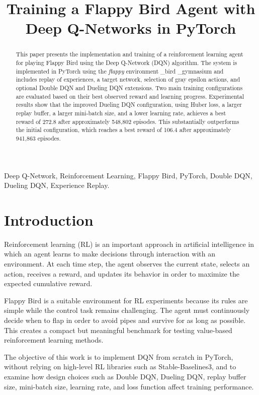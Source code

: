 \documentclass[conference]{IEEEtran}
\title{Training a Flappy Bird Agent with Deep Q-Networks in PyTorch}
\author{%
    \IEEEauthorblockN{Tran Van Thuan}
    \IEEEauthorblockA{\textit{Fill in your institution}\\\textit{Fill in your email}}
    \and
    \IEEEauthorblockN{Nguyen Vo Hoang Khang}
    \IEEEauthorblockA{ \textit{FPT University}\\ \textit{khangnvhse184634@fpt.edu.vn}}
}
\begin{document}
\maketitle

\begin{abstract}
This paper presents the implementation and training of a reinforcement learning agent for playing Flappy Bird using the Deep Q-Network (DQN) algorithm. The system is implemented in PyTorch using the \textit{flappy} environment \_bird \_gymnasium and includes replay of experiences, a target network, selection of gray epsilon actions, and optional Double DQN and Dueling DQN extensions. Two main training configurations are evaluated based on their best observed reward and learning progress. Experimental results show that the improved Dueling DQN configuration, using Huber loss, a larger replay buffer, a larger mini-batch size, and a lower learning rate, achieves a best reward of 272.8 after approximately 548,802 episodes. This substantially outperforms the initial configuration, which reaches a best reward of 106.4 after approximately 941,863 episodes.
\end{abstract}

\begin{IEEEkeywords}
Deep Q-Network, Reinforcement Learning, Flappy Bird, PyTorch, Double DQN, Dueling DQN, Experience Replay.
\end{IEEEkeywords}

\section{Introduction}
Reinforcement learning (RL) is an important approach in artificial intelligence in which an agent learns to make decisions through interaction with an environment. At each time step, the agent observes the current state, selects an action, receives a reward, and updates its behavior in order to maximize the expected cumulative reward.

Flappy Bird is a suitable environment for RL experiments because its rules are simple while the control task remains challenging. The agent must continuously decide when to flap in order to avoid pipes and survive for as long as possible. This creates a compact but meaningful benchmark for testing value-based reinforcement learning methods.

The objective of this work is to implement DQN from scratch in PyTorch, without relying on high-level RL libraries such as Stable-Baselines3, and to examine how design choices such as Double DQN, Dueling DQN, replay buffer size, mini-batch size, learning rate, and loss function affect training performance.
\end{document}
